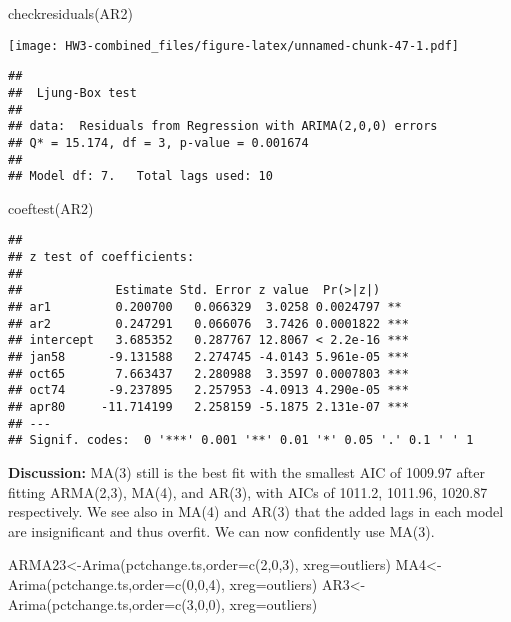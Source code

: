 \documentclass[
]{article}
\newenvironment{Shaded}{\begin{snugshade}}{\end{snugshade}}
\newcommand{\AttributeTok}[1]{\textcolor[rgb]{0.77,0.63,0.00}{#1}}
\newcommand{\DecValTok}[1]{\textcolor[rgb]{0.00,0.00,0.81}{#1}}
\newcommand{\FunctionTok}[1]{\textcolor[rgb]{0.00,0.00,0.00}{#1}}
\newcommand{\NormalTok}[1]{#1}
\newcommand{\OtherTok}[1]{\textcolor[rgb]{0.56,0.35,0.01}{#1}}
\begin{document}
\begin{Shaded}
\begin{Highlighting}[]
\FunctionTok{checkresiduals}\NormalTok{(AR2)}
\end{Highlighting}
\end{Shaded}

\texttt{[image: HW3-combined\_files/figure-latex/unnamed-chunk-47-1.pdf]}

\begin{verbatim}
## 
##  Ljung-Box test
## 
## data:  Residuals from Regression with ARIMA(2,0,0) errors
## Q* = 15.174, df = 3, p-value = 0.001674
## 
## Model df: 7.   Total lags used: 10
\end{verbatim}

\begin{Shaded}
\begin{Highlighting}[]
\FunctionTok{coeftest}\NormalTok{(AR2)}
\end{Highlighting}
\end{Shaded}

\begin{verbatim}
## 
## z test of coefficients:
## 
##             Estimate Std. Error z value  Pr(>|z|)    
## ar1         0.200700   0.066329  3.0258 0.0024797 ** 
## ar2         0.247291   0.066076  3.7426 0.0001822 ***
## intercept   3.685352   0.287767 12.8067 < 2.2e-16 ***
## jan58      -9.131588   2.274745 -4.0143 5.961e-05 ***
## oct65       7.663437   2.280988  3.3597 0.0007803 ***
## oct74      -9.237895   2.257953 -4.0913 4.290e-05 ***
## apr80     -11.714199   2.258159 -5.1875 2.131e-07 ***
## ---
## Signif. codes:  0 '***' 0.001 '**' 0.01 '*' 0.05 '.' 0.1 ' ' 1
\end{verbatim}

\textbf{Discussion:} MA(3) still is the best fit with the smallest AIC
of 1009.97 after fitting ARMA(2,3), MA(4), and AR(3), with AICs of
1011.2, 1011.96, 1020.87 respectively. We see also in MA(4) and AR(3)
that the added lags in each model are insignificant and thus overfit. We
can now confidently use MA(3).

\begin{Shaded}
\begin{Highlighting}[]
\NormalTok{ARMA23}\OtherTok{\textless{}{-}}\FunctionTok{Arima}\NormalTok{(pctchange.ts,}\AttributeTok{order=}\FunctionTok{c}\NormalTok{(}\DecValTok{2}\NormalTok{,}\DecValTok{0}\NormalTok{,}\DecValTok{3}\NormalTok{), }\AttributeTok{xreg=}\NormalTok{outliers)}
\NormalTok{MA4}\OtherTok{\textless{}{-}}\FunctionTok{Arima}\NormalTok{(pctchange.ts,}\AttributeTok{order=}\FunctionTok{c}\NormalTok{(}\DecValTok{0}\NormalTok{,}\DecValTok{0}\NormalTok{,}\DecValTok{4}\NormalTok{), }\AttributeTok{xreg=}\NormalTok{outliers)}
\NormalTok{AR3}\OtherTok{\textless{}{-}}\FunctionTok{Arima}\NormalTok{(pctchange.ts,}\AttributeTok{order=}\FunctionTok{c}\NormalTok{(}\DecValTok{3}\NormalTok{,}\DecValTok{0}\NormalTok{,}\DecValTok{0}\NormalTok{), }\AttributeTok{xreg=}\NormalTok{outliers)}
\end{Highlighting}
\end{Shaded}
\end{document}
